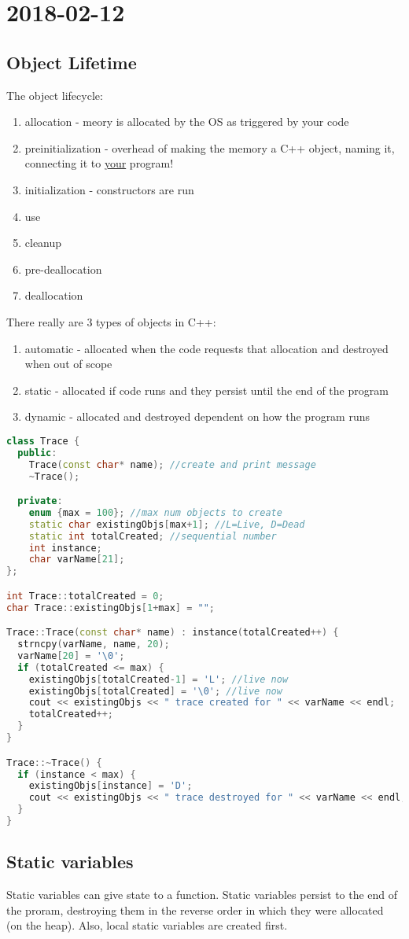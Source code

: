 \section{2018-02-12}

\subsection{Object Lifetime}

The object lifecycle:

\begin{enumerate}
  \item allocation - meory is allocated by the OS as triggered by your code
  \item preinitialization - overhead of making the memory a C++ object, naming it, connecting it to \underline{your} program!
  \item initialization - constructors are run
  \item use
  \item cleanup
  \item pre-deallocation
  \item deallocation
\end{enumerate}

There really are 3 types of objects in C++:

\begin{enumerate}
  \item automatic - allocated when the code requests that allocation and destroyed when out of scope
  \item static - allocated if code runs and they persist until the end of the program
  \item dynamic - allocated and destroyed dependent on how the program runs
\end{enumerate}

\begin{lstlisting}[language=C++]
class Trace {
  public:
    Trace(const char* name); //create and print message
    ~Trace();    

  private:
    enum {max = 100}; //max num objects to create
    static char existingObjs[max+1]; //L=Live, D=Dead
    static int totalCreated; //sequential number
    int instance;
    char varName[21];
};

int Trace::totalCreated = 0;
char Trace::existingObjs[1+max] = "";

Trace::Trace(const char* name) : instance(totalCreated++) {
  strncpy(varName, name, 20);
  varName[20] = '\0';
  if (totalCreated <= max) {
    existingObjs[totalCreated-1] = 'L'; //live now
    existingObjs[totalCreated] = '\0'; //live now
    cout << existingObjs << " trace created for " << varName << endl;
    totalCreated++;
  }
}

Trace::~Trace() {
  if (instance < max) {
    existingObjs[instance] = 'D';
    cout << existingObjs << " trace destroyed for " << varName << endl;
  } 
}
\end{lstlisting}

\subsection{Static variables}

Static variables can give state to a function. Static variables persist to the end of the proram, destroying them in the reverse order in which they were allocated (on the heap). Also, local static variables are created first.